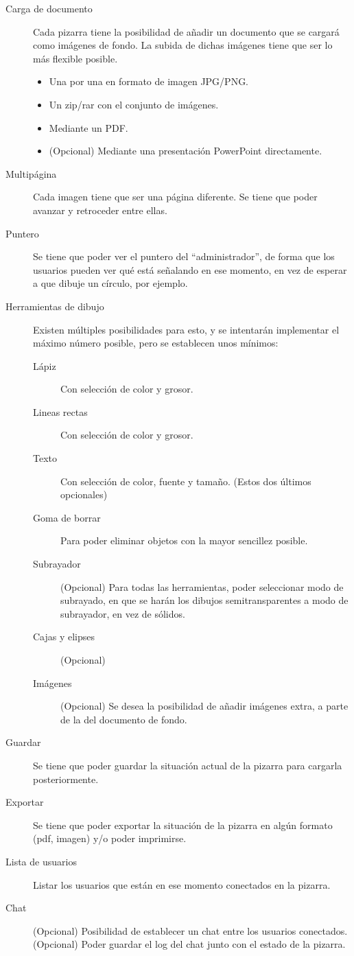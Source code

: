 \documentclass [11pt]{article}
\begin{document}
\begin{description}
	\item[Carga de documento] Cada pizarra tiene la posibilidad de añadir un documento que se cargará como imágenes de fondo. La subida de dichas imágenes tiene que ser lo más flexible posible.
	\begin{itemize}
		\item Una por una en formato de imagen JPG/PNG.
		\item Un zip/rar con el conjunto de imágenes.
		\item Mediante un PDF.
		\item (Opcional) Mediante una presentación PowerPoint directamente.
	\end{itemize}
	\item[Multipágina] Cada imagen tiene que ser una página diferente. Se tiene que poder avanzar y retroceder entre ellas.
	\item[Puntero] Se tiene que poder ver el puntero del ``administrador'', de forma que los usuarios pueden ver qué está señalando en ese momento, en vez de esperar a que dibuje un círculo, por ejemplo.
	\item[Herramientas de dibujo] Existen múltiples posibilidades para esto, y se intentarán implementar el máximo número posible, pero se establecen unos mínimos:
	\begin{description}
		\item[Lápiz] Con selección de color y grosor.
		\item[Lineas rectas] Con selección de color y grosor.
		\item[Texto] Con selección de color, fuente y tamaño. (Estos dos últimos opcionales)
		\item[Goma de borrar] Para poder eliminar objetos con la mayor sencillez posible.
		\item[Subrayador] (Opcional) Para todas las herramientas, poder seleccionar modo de subrayado, en que se harán los dibujos semitransparentes a modo de subrayador, en vez de sólidos.
		\item[Cajas y elipses] (Opcional)
		\item[Imágenes] (Opcional) Se desea la posibilidad de añadir imágenes extra, a parte de la del documento de fondo.
	\end{description}
	\item[Guardar] Se tiene que poder guardar la situación actual de la pizarra para cargarla posteriormente.
	\item[Exportar] Se tiene que poder exportar la situación de la pizarra en algún formato (pdf, imagen) y/o poder imprimirse.
	\item[Lista de usuarios] Listar los usuarios que están en ese momento conectados en la pizarra.
	\item[Chat] (Opcional) Posibilidad de establecer un chat entre los usuarios conectados. (Opcional) Poder guardar el log del chat junto con el estado de la pizarra.
\end{description}
\end{document}
